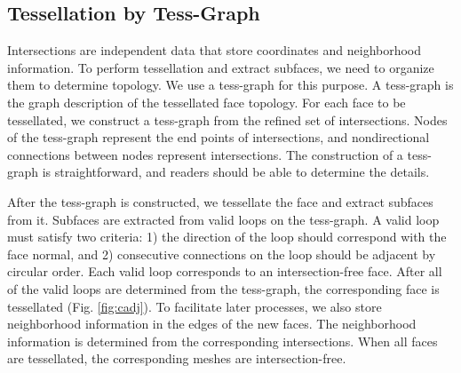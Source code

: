 \subsection{Tessellation by Tess-Graph}
\label{sec:tess}




Intersections are independent data that store coordinates and neighborhood information. To perform tessellation and extract subfaces, we need to organize them to determine topology. We use a tess-graph for this purpose. A tess-graph is the graph description of the tessellated face topology. For each face to be tessellated, we construct a tess-graph from the refined set of intersections. Nodes of the tess-graph represent the end points of intersections, and nondirectional connections between nodes represent intersections. The construction of a tess-graph is straightforward, and readers should be able to determine the details.


After the tess-graph is constructed, we tessellate the face and extract subfaces from it. Subfaces are extracted from valid loops on the tess-graph. A valid loop must satisfy two criteria: 1) the direction of the loop should correspond with the face normal, and 2) consecutive connections on the loop should be adjacent by circular order. Each valid loop corresponds to an intersection-free face. After all of the valid loops are determined from the tess-graph, the corresponding face is tessellated (Fig. \ref{fig:cadj}). To facilitate later processes, we also store neighborhood information in the edges of the new faces. The neighborhood information is determined from the corresponding intersections. When all faces are tessellated, the corresponding meshes are intersection-free.

